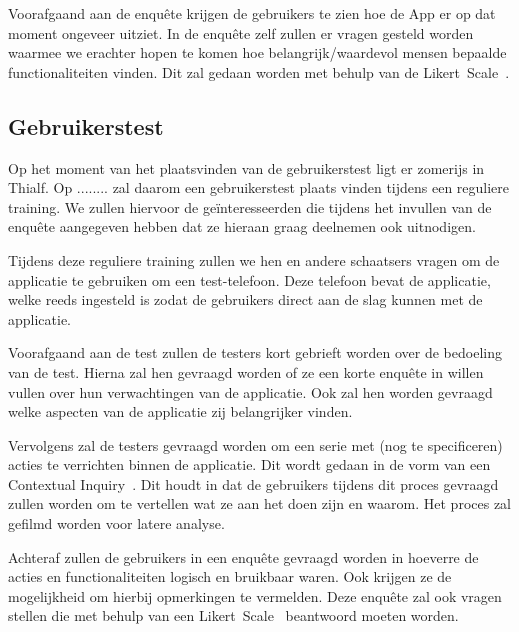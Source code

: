 \bigskip

Voorafgaand aan de enquête krijgen de gebruikers te zien hoe de App er op dat moment ongeveer uitziet. In de enquête zelf zullen er vragen gesteld worden waarmee we erachter hopen te komen hoe belangrijk/waardevol mensen bepaalde functionaliteiten vinden. Dit zal gedaan worden met behulp van de Likert~Scale~\cite{likert1932technique}.

\subsection{Gebruikerstest}
Op het moment van het plaatsvinden van de gebruikerstest ligt er zomerijs in Thialf. Op ........ zal daarom een gebruikerstest plaats vinden tijdens een reguliere training. We zullen hiervoor de geïnteresseerden die tijdens het invullen van de enquête aangegeven hebben dat ze hieraan graag deelnemen ook uitnodigen.

Tijdens deze reguliere training zullen we hen en andere schaatsers vragen om de applicatie te gebruiken om een test-telefoon. Deze telefoon bevat de applicatie, welke reeds ingesteld is zodat de gebruikers direct aan de slag kunnen met de applicatie. 

\bigskip

Voorafgaand aan de test zullen de testers kort gebrieft worden over de bedoeling van de test. Hierna zal hen gevraagd worden of ze een korte enquête in willen vullen over hun verwachtingen van de applicatie. Ook zal hen worden gevraagd welke aspecten van de applicatie zij belangrijker vinden.

Vervolgens zal de testers gevraagd worden om een serie met (nog te specificeren) acties te verrichten binnen de applicatie. Dit wordt gedaan in de vorm van een Contextual Inquiry~\cite{holtzblatt1993contextual}. Dit houdt in dat de gebruikers tijdens dit proces gevraagd zullen worden om te vertellen wat ze aan het doen zijn en waarom. Het proces zal gefilmd worden voor latere analyse.

Achteraf zullen de gebruikers in een enquête gevraagd worden in hoeverre de acties en functionaliteiten logisch en bruikbaar waren. Ook krijgen ze de mogelijkheid om hierbij opmerkingen te vermelden. Deze enquête zal ook vragen stellen die met behulp van een Likert~Scale~\cite{likert1932technique} beantwoord moeten worden.